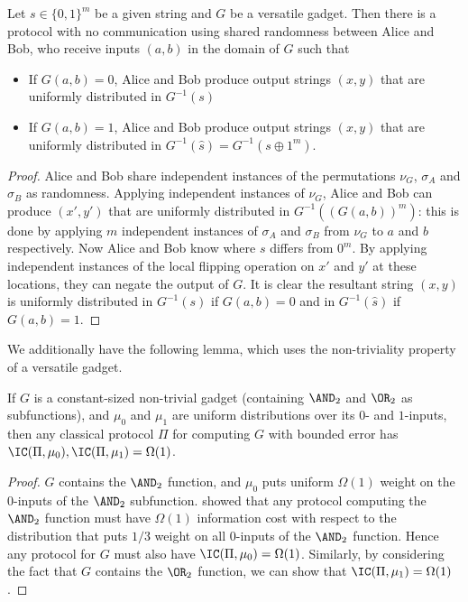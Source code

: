 \begin{lemma}\label{lem:s-sampling}
Let $s\in\{0,1\}^m$ be a given string and $G$ be a versatile gadget. Then there is a protocol with no communication using shared randomness between Alice and Bob, who receive inputs $(a,b)$ in the domain of $G$ such that
\begin{itemize}
 \item If $G(a,b)=0$, Alice and Bob produce output strings $(x,y)$ that are uniformly distributed in $G^{-1}(s)$
 \item If $G(a,b)=1$, Alice and Bob produce output strings $(x,y)$ that are uniformly distributed in $G^{-1}(\hat{s}) = G^{-1}(s\oplus1^m)$.
\end{itemize}
\end{lemma}

\begin{proof}
Alice and Bob share independent instances of the permutations $\nu_G$, $\sigma_A$ and $\sigma_B$ as randomness. Applying independent instances of $\nu_G$, Alice and Bob can produce $(x',y')$ that are uniformly distributed in $G^{-1}((G(a,b))^m)$: this is done by applying $m$ independent instances of $\sigma_A$ and $\sigma_B$ from $\nu_G$ to $a$ and $b$ respectively. Now Alice and Bob know where $s$ differs from $0^m$. By applying independent instances of the local flipping operation on $x'$ and $y'$ at these locations, they can negate the output of $G$. It is clear the resultant string $(x,y)$ is uniformly distributed in $G^{-1}(s)$ if $G(a,b)=0$ and in $G^{-1}(\hat{s})$ if $G(a,b)=1$.
\end{proof}

We additionally have the following lemma, which
uses the non-triviality property of a versatile gadget.

\begin{lemma}\label{lem:ANDOR-classical}
If $G$ is a constant-sized non-trivial gadget (containing $\AND_2$ and $\OR_2$ as subfunctions), and $\mu_0$ and 
$\mu_1$ are uniform distributions over its $0$- and $1$-inputs, 
then any classical protocol $\Pi$ for computing $G$ with bounded 
error has $\IC(\Pi,\mu_0), \IC(\Pi,\mu_1) = \Omega(1)$.
\end{lemma}

\begin{proof}
$G$ contains the $\AND_2$ function, and $\mu_0$ puts uniform 
$\Omega(1)$ weight on the 0-inputs of the $\AND_2$ subfunction. 
\cite{BJKS04} showed that any protocol computing the $\AND_2$ 
function must have $\Omega(1)$ information cost with
respect to the distribution that puts
$1/3$ weight on all $0$-inputs of the $\AND_2$ function. Hence any 
protocol for $G$ must also have $\IC(\Pi,\mu_0)=\Omega(1)$. 
Similarly, by considering the fact that $G$ contains the $\OR_2$ 
function, we can show that $\IC(\Pi,\mu_1)=\Omega(1)$.
\end{proof}


